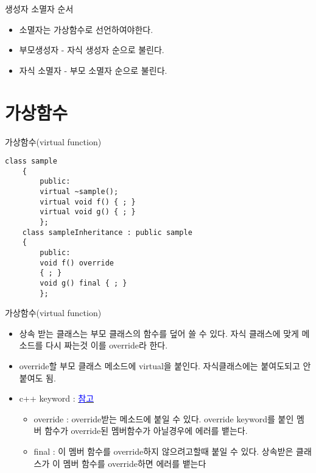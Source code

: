 \documentclass[10pt]{beamer}
\begin{document}
\begin{frame}[fragile]{생성자 소멸자 순서}
    \begin{itemize}
        \item 소멸자는 가상함수로 선언하여야한다.
        \item 부모생성자 - 자식 생성자 순으로 불린다.
        \item 자식 소멸자 - 부모 소멸자 순으로 불린다.
    \end{itemize}
\end{frame}    


\section{가상함수}

\begin{frame}[fragile]{가상함수(virtual function)}
    \begin{lstlisting}[style = CppStyle]
    class sample
    {
        public:
        virtual ~sample();
        virtual void f() { ; }
        virtual void g() { ; }
        };
    class sampleInheritance : public sample
    {
        public:
        void f() override
        { ; }
        void g() final { ; }
        };
    \end{lstlisting}
\end{frame}

\begin{frame}[fragile]{가상함수(virtual function)}
    \begin{itemize}
        \item 상속 받는 클래스는 부모 클래스의 함수를 덮어 쓸 수 있다. 자식 클래스에 맞게 메소드를 다시 짜는것 이를 override라 한다.
        \item override할 부모 클래스 메소드에 virtual을 붙인다. 자식클래스에는 붙여도되고 안붙여도 됨.
        \item c++ keyword : \href{https://youtu.be/JMw0F8FFe80}{\textcolor{blue}{참고}}
        \begin{itemize}
            \item  override : override받는 메소드에 붙일 수 있다. override keyword를 붙인 멤버 함수가 override된 멤버함수가 아닐경우에 에러를 뱉는다.
            \item  final : 이 멤버 함수를 override하지 않으려고할때 붙일 수 있다. 상속받은 클래스가 이 멤버 함수를 override하면 에러를 뱉는다
        \end{itemize}
    \end{itemize}
\end{frame}
\end{document}
